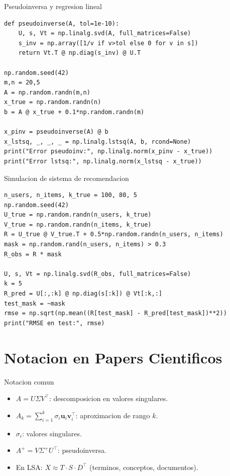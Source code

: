 \documentclass[aspectratio=169, 10pt, xcolor=table]{beamer}
\begin{document}
\begin{frame}[fragile]{Pseudoinversa y regresion lineal}
    \begin{lstlisting}
def pseudoinverse(A, tol=1e-10):
    U, s, Vt = np.linalg.svd(A, full_matrices=False)
    s_inv = np.array([1/v if v>tol else 0 for v in s])
    return Vt.T @ np.diag(s_inv) @ U.T

np.random.seed(42)
m,n = 20,5
A = np.random.randn(m,n)
x_true = np.random.randn(n)
b = A @ x_true + 0.1*np.random.randn(m)

x_pinv = pseudoinverse(A) @ b
x_lstsq, _, _, _ = np.linalg.lstsq(A, b, rcond=None)
print("Error pseudoinv:", np.linalg.norm(x_pinv - x_true))
print("Error lstsq:", np.linalg.norm(x_lstsq - x_true))
    \end{lstlisting}
\end{frame}

\begin{frame}[fragile]{Simulacion de sistema de recomendacion}
    \begin{lstlisting}
n_users, n_items, k_true = 100, 80, 5
np.random.seed(42)
U_true = np.random.randn(n_users, k_true)
V_true = np.random.randn(n_items, k_true)
R = U_true @ V_true.T + 0.5*np.random.randn(n_users, n_items)
mask = np.random.rand(n_users, n_items) > 0.3
R_obs = R * mask

U, s, Vt = np.linalg.svd(R_obs, full_matrices=False)
k = 5
R_pred = U[:,:k] @ np.diag(s[:k]) @ Vt[:k,:]
test_mask = ~mask
rmse = np.sqrt(np.mean((R[test_mask] - R_pred[test_mask])**2))
print("RMSE en test:", rmse)
    \end{lstlisting}
\end{frame}

\section{Notacion en Papers Cientificos}

\begin{frame}{Notacion comun}
    \begin{itemize}
        \item $A = U\Sigma V^\top$: descomposicion en valores singulares.
        \item $A_k = \sum_{i=1}^k \sigma_i \mathbf{u}_i \mathbf{v}_i^\top$: aproximacion de rango $k$.
        \item $\sigma_i$: valores singulares.
        \item $A^+ = V\Sigma^+ U^\top$: pseudoinversa.
        \item En LSA: $X \approx T\cdot S\cdot D^\top$ (terminos, conceptos, documentos).
    \end{itemize}
\end{frame}
\end{document}
